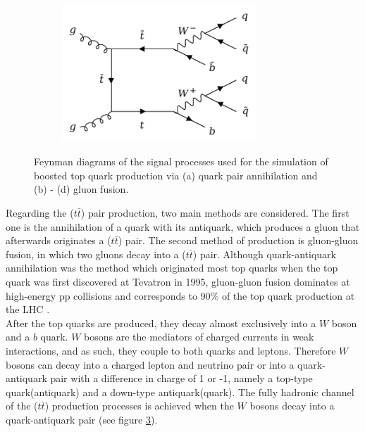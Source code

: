 \documentclass[main]{subfiles} %
\begin{document}
\begin{figure}[H]
\begin{subfigure}[h]{0.49\textwidth}
          \caption{}
         \label{fig:feynman_tt_ggfusion2}
     \end{subfigure}
     \begin{subfigure}[h]{0.49\textwidth}
         \centering
         \includegraphics[width=0.8\textwidth]{../Figures/Datasets/pp_tt/gg_tt_qq_3.png}
          \caption{}
         \label{fig:feynman_tt_ggfusion3}
     \end{subfigure}
     \caption{Feynman diagrams of the signal processes used for the simulation of boosted top quark production via (a) quark pair annihilation and (b) - (d) gluon fusion.}
        \label{fig:feynman_tt}
\end{figure}

Regarding the ($t\bar{t}$) pair production, two main methods are considered. The first one is the annihilation of a quark with its antiquark, which produces a gluon that afterwards originates a ($t\bar{t}$) pair. The second method of production is gluon-gluon fusion, in which two gluons decay into a ($t\bar{t}$) pair. Although quark-antiquark annihilation was the method which originated most top quarks when the top quark was first discovered at Tevatron in 1995, gluon-gluon fusion dominates at high-energy pp collisions and corresponds to 90\% of the top quark production at the LHC \cite{Quadt2006}. \\

After the top quarks are produced, they decay almost exclusively into a $W$ boson and a $b$ quark. $W$ bosons are the mediators of charged currents in weak interactions, and as such, they couple to both quarks and leptons. Therefore $W$ bosons can decay into a charged lepton and neutrino pair or into a quark-antiquark pair with a difference in charge of 1 or -1, namely a top-type quark(antiquark) and a down-type antiquark(quark). The fully hadronic channel of the ($t\bar{t}$) production processes is achieved when the $W$ bosons decay into a quark-antiquark pair (see figure \ref{fig:feynman_tt}). \\
\end{document}
